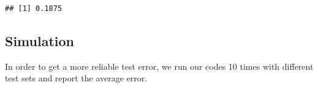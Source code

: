 \documentclass[../main.tex]{subfiles}
\begin{document}
\begin{Shaded}
\begin{Highlighting}[]
\StringTok{ }\OperatorTok{~}\NormalTok{, }
                  \NormalTok{(}
                    \NormalTok{(}\NormalTok{, }\NormalTok{, }\NormalTok{, }\NormalTok{), }
                    \NormalTok{(}\NormalTok{, }\NormalTok{, }\NormalTok{, }\NormalTok{, }\NormalTok{)}
\NormalTok{                  ))}
\StringTok{ }\OperatorTok{\$}
\OperatorTok{!=}\StringTok{ }\OperatorTok{\$}
\end{Highlighting}
\end{Shaded}

\begin{verbatim}
## [1] 0.1875
\end{verbatim}

\vspace{0.5cm}
\subsection{Simulation}
\noindent In order to get a more reliable test error, we run our codes 10 times with different test sets and report the average error.
\end{document}
